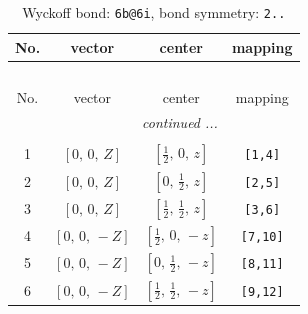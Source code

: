 \documentclass[fleqn,8pt]{jsarticle}
\begin{document}
\begin{longtable}{cccc}
\caption{Wyckoff bond: {\tt 6b@6i}, bond symmetry: {\tt 2..}}
 \\
 \hline \hline
No. & vector & center & mapping \\ \hline \endfirsthead

\multicolumn{3}{l}{\tablename\ \thetable{}} \\
 \hline \hline
No. & vector & center & mapping \\ \hline \endhead

 \hline \hline
\multicolumn{3}{r}{\footnotesize\it continued ...} \\ \endfoot

 \hline \hline
\multicolumn{3}{r}{} \\ \endlastfoot

1 & $\left[ 0,\, 0,\, Z \right]$ & $\left[ \frac{1}{2},\, 0,\, z \right]$ & {\tt [1,4]} \\ \hline
2 & $\left[ 0,\, 0,\, Z \right]$ & $\left[ 0,\, \frac{1}{2},\, z \right]$ & {\tt [2,5]} \\ \hline
3 & $\left[ 0,\, 0,\, Z \right]$ & $\left[ \frac{1}{2},\, \frac{1}{2},\, z \right]$ & {\tt [3,6]} \\ \hline
4 & $\left[ 0,\, 0,\, - Z \right]$ & $\left[ \frac{1}{2},\, 0,\, - z \right]$ & {\tt [7,10]} \\ \hline
5 & $\left[ 0,\, 0,\, - Z \right]$ & $\left[ 0,\, \frac{1}{2},\, - z \right]$ & {\tt [8,11]} \\ \hline
6 & $\left[ 0,\, 0,\, - Z \right]$ & $\left[ \frac{1}{2},\, \frac{1}{2},\, - z \right]$ & {\tt [9,12]} \\
\end{longtable}
\renewcommand{\arraystretch}{1.2}
\end{document}
